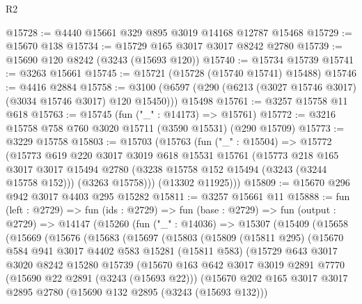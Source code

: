 \begin{lexlean}{R2}
\begin{coremodule}
@15728 := @4440 @15661 @329 @895 @3019 @14168 @12787 @15468
@15729 := @15670 @138
@15734 := @15729 @165 @3017 @3017 @8242 @2780
@15739 := @15690 @120 @8242 (@3243 (@15693 @120))
@15740 := @15734 @15739
@15741 := @3263 @15661
@15745 := @15721 (@15728 (@15740 @15741) @15488)
@15746 := @4416 @2884
@15758 := @3100 (@6597 (@290 (@6213 (@3027 @15746 @3017) (@3034 @15746 @3017) @120 @15450))) @15498
@15761 := @3257 @15758 @11 @618
@15763 := @15745 (fun ("_" : @14173) => @15761)
@15772 := @3216 @15758 @758 @760 @3020 @15711 (@3590 @15531) (@290 @15709)
@15773 := @3229 @15758
@15803 := @15703
    (@15763
      (fun ("_" : @15504) =>
      @15772
        (@15773
          @619
          @220
          @3017
          @3019
          @618
          @15531
          @15761
          (@15773
            @218
            @165
            @3017
            @3017
            @15494
            @2780
            (@3238 @15758 @152 @15494 (@3243 (@3244 @15758 @152)))
            (@3263 @15758)))
        (@13302 @11925)))
@15809 := @15670 @296 @942 @3017 @4403 @295 @15282
@15811 := @3257 @15661 @11
@15888 := fun (left : @2729) =>
  fun (ids : @2729) =>
  fun (base : @2729) =>
  fun (output : @2729) =>
  @14147
    (@15260
      (fun ("_" : @14036) =>
      @15307
        (@15409
          (@15658
            (@15669
              (@15676
                (@15683
                  (@15697
                    (@15803
                      (@15809
                        (@15811 @295)
                        (@15670
                          @584
                          @941
                          @3017
                          @4402
                          @583
                          @15281
                          (@15811 @583)
                          (@15729
                            @643
                            @3017
                            @3020
                            @8242
                            @15280
                            @15739
                            (@15670
                              @163
                              @642
                              @3017
                              @3019
                              @2891
                              @7770
                              (@15690 @22 @2891 (@3243 (@15693 @22)))
                              (@15670
                                @202
                                @165
                                @3017
                                @3017
                                @2895
                                @2780
                                (@15690 @132 @2895 (@3243 (@15693 @132)))

\end{coremodule}
\end{lexlean}
